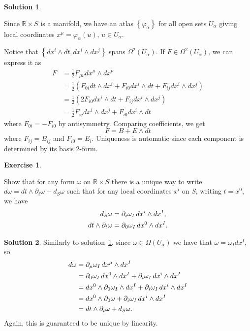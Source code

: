 \documentclass[11pt, a4paper]{report}
\theoremstyle{definition}
\newtheorem{exercise}{Exercise}[part]
\newtheorem{solution}{Solution}[part]
\newenvironment{ex}{\begin{exercise}}{\end{exercise}\pagebreak[1]}
\newenvironment{sol}{\begin{solution}}{\end{solution}\pagebreak[3]}
\newcommand*{\op}[1]{\ensuremath\mathop{}\mathopen{}#1}
\renewcommand*{\d}{\op{d}}
\begin{document}
\begin{sol}\label{sol:bplusedt}

Since $\mathbb{R} \times S$ is a manifold, we have an atlas $\left\{\varphi_\alpha\right\}$ for all open sets $U_\alpha$ giving local coordinates $x^\mu = \varphi_\alpha(u)$, $u \in U_\alpha$.

Notice that $\left\{dx^i \wedge dt, dx^i \wedge dx^j\right\}$ spans $\Omega^2(U_\alpha)$.
If $F \in \Omega^2(U_\alpha)$, we can express it as
\begin{align*}
    F &= \frac{1}{2} F_{\mu\nu}dx^\mu \wedge dx^\nu \\
      &= \frac{1}{2} \left( F_{0i} dt \wedge dx^i + F_{i0} dx^i \wedge dt + F_{ij} dx^i \wedge dx^j \right) \\
      &= \frac{1}{2} \left( 2 F_{i0} dx^i \wedge dt + F_{ij} dx^i \wedge dx^j \right) \\
      &= \frac{1}{2} F_{ij} dx^i \wedge dx^j + F_{i0} dx^i \wedge dt
\end{align*}
where $F_{0i} = -F_{i0}$ by antisymmetry. Comparing coefficients, we get
\[
    F = B + E \wedge dt
\]
where $F_{ij} = B_{ij}$ and $F_{i0} = E_i$. Uniqueness is automatic since each component is determined by its basis 2-form.

\end{sol}

\begin{ex}\label{ex:pformspaceandtime}

Show that for any form $\omega$ on $\mathbb{R} \times S$ there is a unique way to write $d\omega = dt \wedge \partial_t \omega + d_S \omega$ such that for any local coordinates $x^i$ on $S$, writing $t = x^0$, we have
\begin{align*}
    d_S\omega &= \partial_i \omega_I \d x^i \wedge dx^I, \\
    dt \wedge \partial_t \omega &= \partial_0 \omega_I \d x^0 \wedge dx^I.
\end{align*}

\end{ex}

\begin{sol}

Similarly to solution~\ref{sol:bplusedt}, since $\omega \in \Omega(U_\alpha)$ we have that $\omega = \omega_I dx^I$, so
\begin{align*}
    d\omega &= \partial_\mu \omega_I \d x^\mu \wedge dx^I \\
        &= \partial_0 \omega_I \d x^0 \wedge dx^I + \partial_i \omega_I \d x^i \wedge dx^I \\
        &= dx^0 \wedge \partial_0 \omega_I \wedge dx^I + \partial_i \omega_I \d x^i \wedge dx^I \\
        &= dx^0 \wedge \partial_0 \omega + \partial_i \omega_I \d x^i \wedge dx^I \\
        &= dt \wedge \partial_t \omega + d_S \omega.
\end{align*}
Again, this is guaranteed to be unique by linearity.

\end{sol}
\end{document}
